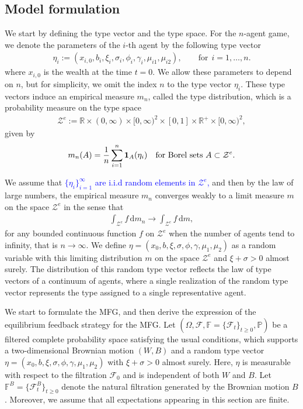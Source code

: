 \documentclass[11pt]{article}
\newcommand \drm {\mathrm{d}}
\numberwithin{equation}{section}
\begin{document}
	\subsection{Model formulation}\label{subsec:MF-model}
	We start by defining the type vector and the type space. For the \(n \)-agent game, we denote the parameters of the \(i\)-th agent by the following type vector
	\begin{align}
		\eta_i := (x_{i,0}, b_i, \xi_i, \sigma_i, \phi_i, \gamma_i, \mu_{i1}, \mu_{i2}), \qquad \text{for}~~i=1,\ldots,n.
	\end{align}
	where \(x_{i,0}\) is the wealth at the time \(t=0\).
	We allow these parameters to depend on \(n\), but for simplicity, we omit the index \(n\) to the type vector \(\eta_i\). These type vectors induce an empirical measure \(m_n\), called the type distribution, which is a probability measure on the type space
	\begin{align*}
			\mathcal{Z}^e:=\mathbb{R}\times(0,\infty)\times [0,\infty)^2\times[0,1]\times\mathbb{R}^+\times[0,\infty)^2,
	\end{align*}
	given by
	\begin{align}
		m_n(A) = \frac{1}{n} \sum_{i=1}^{n} {\bf{1}}_A(\eta_i) \quad \text{for Borel sets } A \subset \mathcal{Z}^e. \label{eq:mn}
	\end{align}
	
We assume that \textcolor{blue}{\(\{\eta_i\}_{i=1}^\infty\) are i.i.d random elements in \(\mathcal{Z}^e\),} and then by the law of large numbers, the empirical measure \(m_n\) converges weakly to a limit measure \(m\) on the space \(\mathcal{Z}^e\) in the sense that
	\begin{align}
		\int_{\mathcal{Z}^e} f \, \drm m_n \to \int_{\mathcal{Z}^e} f \, \drm m,  \label{eq:Mweak_converge}
	\end{align}
	for any bounded continuous function \(f\) on \(\mathcal{Z}^e\) when the number of agents tend to infinity, that is \(n\to\infty\). We define \(\eta = (x_0, b, \xi, \sigma, \phi, \gamma, \mu_1, \mu_2)\) as a random variable with this limiting distribution \(m\) on the space \(\mathcal{Z}^e\) and \(\xi+\sigma>0\) almost surely. The distribution of this random type vector reflects the law of type vectors of a continuum of agents, where a single realization of the random type vector represents the type assigned to a single representative agent.
	
	We start to formulate the MFG, and then derive the expression of the equilibrium feedback strategy for the MFG. Let \((\Omega, \mathcal{F},\mathbb{F}=\{\mathcal{F}_t\}_{t\geq 0}, \mathbb{P})\) be a filtered complete probability space satisfying the usual conditions, which supports a two-dimensional Brownian motion \((W, B)\) and a random type vector \(\eta = (x_0, b, \xi, \sigma, \phi, \gamma, \mu_1, \mu_2)\) with \(\xi+\sigma>0\) almost surely. Here, \(\eta\)  is measurable with respect to the filtration \(\mathcal{F}_0\) and is independent of both \(W\) and \(B\). Let \(\mathbb{F}^B = \{\mathcal{F}_t^B\}_{t \geq 0}\) denote the natural filtration generated by the Brownian motion \(B\). Moreover, we assume that all expectations appearing in this section are finite.
	
\end{document}
